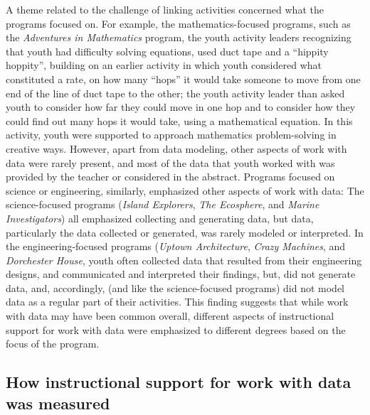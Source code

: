 \documentclass[]{msu-thesis}
\theoremstyle{definition}
\theoremstyle{definition}
\theoremstyle{definition}
\theoremstyle{remark}
\begin{document}
A theme related to the challenge of linking activities concerned what
the programs focused on. For example, the mathematics-focused programs,
such as the \emph{Adventures in Mathematics} program, the youth activity
leaders recognizing that youth had difficulty solving equations, used
duct tape and a ``hippity hoppity'', building on an earlier activity in
which youth considered what constituted a rate, on how many ``hops'' it
would take someone to move from one end of the line of duct tape to the
other; the youth activity leader than asked youth to consider how far
they could move in one hop and to consider how they could find out many
hops it would take, using a mathematical equation. In this activity,
youth were supported to approach mathematics problem-solving in creative
ways. However, apart from data modeling, other aspects of work with data
were rarely present, and most of the data that youth worked with was
provided by the teacher or considered in the abstract. Programs focused
on science or engineering, similarly, emphasized other aspects of work
with data: The science-focused programs (\emph{Island Explorers},
\emph{The Ecosphere}, and \emph{Marine Investigators}) all emphasized
collecting and generating data, but data, particularly the data
collected or generated, was rarely modeled or interpreted. In the
engineering-focused programs (\emph{Uptown Architecture}, \emph{Crazy
Machines}, and \emph{Dorchester House}, youth often collected data that
resulted from their engineering designs, and communicated and
interpreted their findings, but, did not generate data, and,
accordingly, (and like the science-focused programs) did not model data
as a regular part of their activities. This finding suggests that while
work with data may have been common overall, different aspects of
instructional support for work with data were emphasized to different
degrees based on the focus of the program.

\subsection{How instructional support for work with data was
measured}\label{how-instructional-support-for-work-with-data-was-measured}
\end{document}
